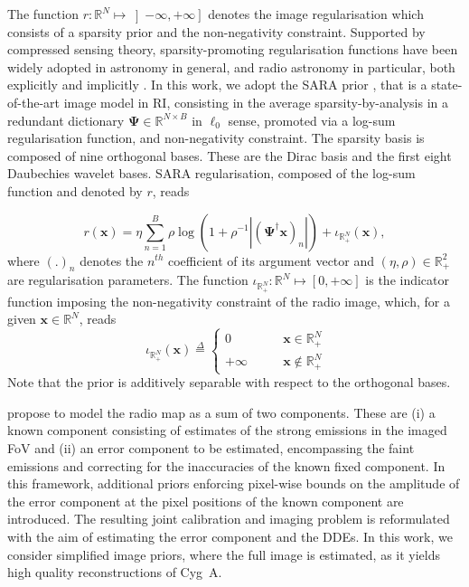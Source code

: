 \documentclass[fleqn,usenatbib]{mnras}
\newcommand{\alg}[1]{\textsc{#1}}
\newcommand{\xb}{\ensuremath{\boldsymbol{x}}}
\newcommand{\Psib}{\ensuremath{\boldsymbol{\Psi}}}
\newcommand{\eR}{\mathbb{R}}
\begin{document}
\noindent
The function $r:\eR^{N}\mapsto \left]-\infty,+\infty\right]$ denotes the image regularisation which consists of a sparsity prior and the non-negativity constraint. Supported by compressed sensing theory, sparsity-promoting regularisation functions have been widely adopted in astronomy in general, and radio astronomy in particular, both explicitly \citep[e.g.][]{Wiaux09,li11,Dabbech2012,Carrillo2012,Garsden2015,Dabbech2015} and implicitly \citep[the celebrated \alg{clean} framework, e.g.][]{hogbom74,cornwell08b}. In this work, we adopt {{the}} {SARA} prior \citep{Carrillo2012}, that is a state-of-the-art image model in RI, consisting in the average sparsity-by-analysis in a redundant dictionary $\Psib\in \eR^{ N\times B}$ {in $\ell_0$ sense}, promoted via a log-sum regularisation function, and non-negativity constraint. The sparsity basis is composed of nine orthogonal bases. These are the Dirac basis and the first eight Daubechies wavelet bases. SARA regularisation, composed of the log-sum function and denoted by $r$, reads

\begin{equation}
\label{eq:model-log-prior}
 r(\xb) = \eta \sum_{n=1}^{B} {{\rho \log\left( 1 +\rho^{-1}{\left | \left(\Psib^\dagger \xb \right)_n\right|} \right)}} + \iota_{\eR^{N}_{+}}(\xb),
\end{equation} 
where $\left(.\right)_n$ denotes the $n^{th}$ coefficient of its argument vector {and} $(\eta,\rho) \in \eR^2_+$ are regularisation parameters. The function $\iota_{\eR^{N}_{+}}:\eR^{N}\mapsto \left[0,+\infty\right]$ is the indicator function imposing the non-negativity constraint of the radio image, which, for a given $\xb \in \eR^N$, reads
\begin{equation}
	 ~\iota_{{\eR^N_{+}}} (\xb) \overset{\Delta}{=} \left\{ \begin{aligned}
					0 & \qquad \xb \in {\eR^N_{+}} \\
					+\infty & \qquad \xb \notin {\eR^N_{+}}
				 \end{aligned} \right. 
				 \end{equation}
Note that the prior is {additively} separable with respect to the orthogonal bases. 

\citet{Repetti2017} propose to model the radio map as a sum of two components. These are (i) a known component consisting of estimates of the strong emissions in the imaged FoV and (ii) an error component to be estimated, encompassing the faint emissions and correcting for the inaccuracies of the known fixed component. In this framework, additional priors enforcing pixel-wise bounds on the amplitude of the error component at the pixel positions of the known component are introduced. The resulting joint calibration and imaging problem is reformulated {{with}} the aim {{of estimating}} the error component and the DDEs. In this work, we {consider simplified image priors, where the full image is estimated,} as it yields high quality reconstructions of Cyg~A.
\end{document}
